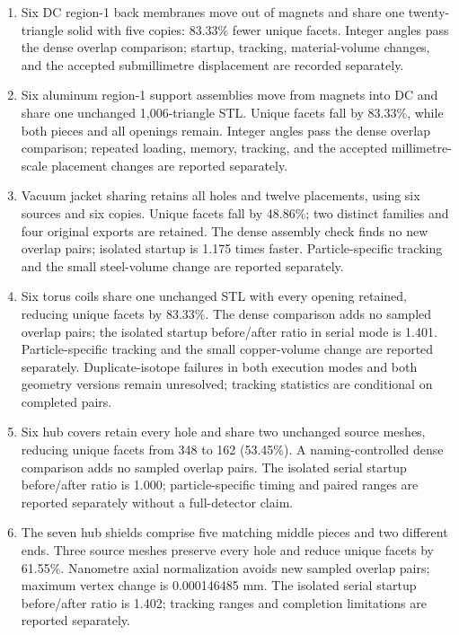 \begin{enumerate}
\item Six DC region-1 back membranes move out of magnets and share one twenty-triangle solid with five copies:
83.33\% fewer unique facets. Integer angles pass the dense overlap comparison; startup, tracking,
material-volume changes, and the accepted submillimetre displacement are recorded separately.

\item Six aluminum region-1 support assemblies move from magnets into DC and share one unchanged 1,006-triangle STL.
Unique facets fall by 83.33\%, while both pieces and all openings remain. Integer angles pass the dense
overlap comparison; repeated loading, memory, tracking, and the accepted millimetre-scale placement changes
are reported separately.

\item Vacuum jacket sharing retains all holes and twelve placements, using six sources and six copies. Unique facets
fall by 48.86\%; two distinct families and four original exports are retained. The dense assembly check finds
no new overlap pairs; isolated startup is 1.175 times faster. Particle-specific tracking and the small
steel-volume change are reported separately.

\item Six torus coils share one unchanged STL with every opening retained, reducing unique facets by 83.33\%. The
dense comparison adds no sampled overlap pairs; the isolated startup before/after ratio in serial mode is
1.401. Particle-specific tracking and the small copper-volume change are reported separately.
Duplicate-isotope failures in both execution modes and both geometry versions remain unresolved; tracking
statistics are conditional on completed pairs.

\item Six hub covers retain every hole and share two unchanged source meshes, reducing unique facets from 348 to 162
(53.45\%). A naming-controlled dense comparison adds no sampled overlap pairs. The isolated serial startup
before/after ratio is 1.000; particle-specific timing and paired ranges are reported separately without a
full-detector claim.

\item The seven hub shields comprise five matching middle pieces and two different ends. Three source meshes
preserve every hole and reduce unique facets by 61.55\%. Nanometre axial normalization avoids new sampled
overlap pairs; maximum vertex change is 0.000146485 mm. The isolated serial startup before/after ratio is
1.402; tracking ranges and completion limitations are reported separately.


\end{enumerate}
